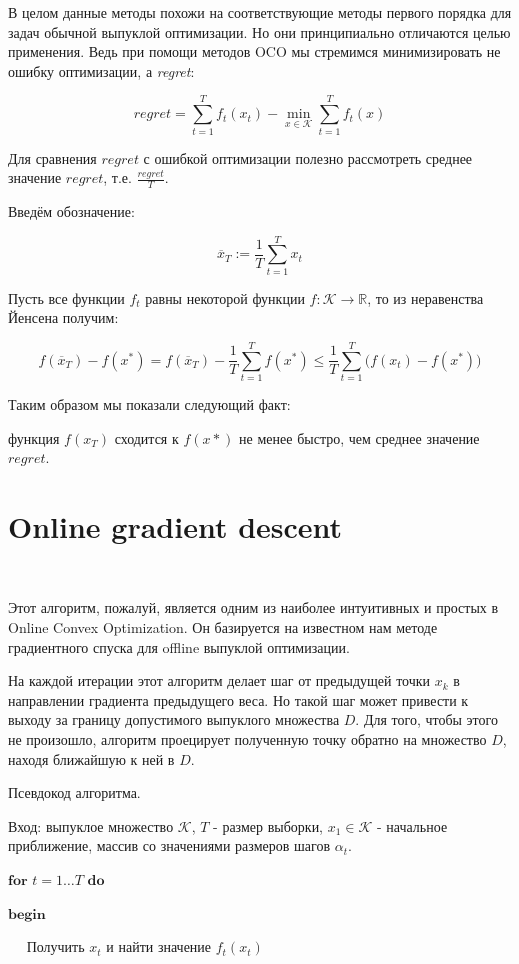 \documentclass[12pt]{article}
\begin{document}
В целом данные методы похожи на соответствующие методы первого порядка для задач обычной выпуклой оптимизации. Но они принципиально отличаются целью применения. Ведь при помощи методов OCO мы стремимся минимизировать не ошибку оптимизации, а \textit{regret}:

$$regret = \sum\limits_{t=1}^T f_t(x_t) - \min\limits_{x \in \mathcal{K}} \sum\limits_{t=1}^T f_t(x)$$

Для сравнения $regret$ с ошибкой оптимизации полезно рассмотреть среднее значение $regret$, т.е. $\frac{regret}{T}$.

Введём обозначение:

$$\overline{x}_T := \frac{1}{T}\sum\limits_{t=1}^T x_t$$

Пусть все функции $f_t$ равны некоторой функции $f : \mathcal{K} \rightarrow \mathbb{R}$, то из неравенства Йенсена получим:

$$f(\overline{x}_T)-f(x^*) = f(\overline{x}_T)- \frac{1}{T} \sum\limits_{t=1}^T f(x^*) \leq \frac{1}{T}\sum\limits_{t=1}^T \big(f(x_t)-   f(x^*)\big	)$$

Таким образом мы показали следующий факт: 

функция $f(x_T)$ сходится к $f(x*)$ не менее быстро, чем среднее значение $regret$.

\section*{Online gradient descent}
$ $

Этот алгоритм, пожалуй, является одним из наиболее интуитивных и простых в Online Convex Optimization. Он базируется на известном нам методе градиентного спуска для offline выпуклой оптимизации.

На каждой итерации этот алгоритм делает шаг от предыдущей точки $x_k$ в направлении градиента предыдущего веса. Но такой шаг может привести к выходу за границу допустимого выпуклого множества $D$. Для того, чтобы этого не произошло, алгоритм проецирует полученную точку обратно на множество $D$, находя ближайшую к ней в $D$.

Псевдокод алгоритма.

Вход: выпуклое множество $\mathcal{K}$, $T$ - размер выборки, $x_1 \in \mathcal{K}$ - начальное приближение, массив со значениями размеров шагов $\alpha_t$.

$\textbf{for}$ $t = 1 \dots T$ $\textbf{do}$

$\textbf{begin}$

$\quad$ Получить $x_t$ и найти значение $f_t(x_t)$
\end{document}
